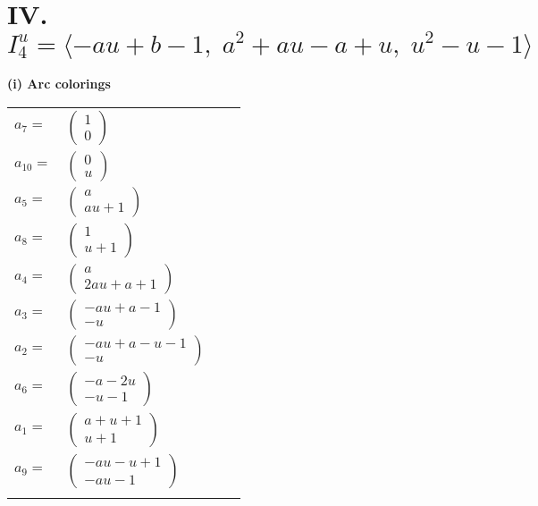 \documentclass[1p]{elsarticle_modified}
\theoremstyle{definition}
\begin{document}
\centering \section*{IV. $I^u_{4}= \langle - a u+b-1,\;a^2+a u- a+u,\;u^2- u-1 \rangle$}
\flushleft \textbf{(i) Arc colorings}\\
\begin{tabular}{m{7pt} m{180pt} m{7pt} m{180pt} }
\flushright $a_{7}=$&$\begin{pmatrix}1\\0\end{pmatrix}$ \\
\flushright $a_{10}=$&$\begin{pmatrix}0\\u\end{pmatrix}$ \\
\flushright $a_{5}=$&$\begin{pmatrix}a\\a u+1\end{pmatrix}$ \\
\flushright $a_{8}=$&$\begin{pmatrix}1\\u+1\end{pmatrix}$ \\
\flushright $a_{4}=$&$\begin{pmatrix}a\\2 a u+a+1\end{pmatrix}$ \\
\flushright $a_{3}=$&$\begin{pmatrix}- a u+a-1\\- u\end{pmatrix}$ \\
\flushright $a_{2}=$&$\begin{pmatrix}- a u+a- u-1\\- u\end{pmatrix}$ \\
\flushright $a_{6}=$&$\begin{pmatrix}- a-2 u\\- u-1\end{pmatrix}$ \\
\flushright $a_{1}=$&$\begin{pmatrix}a+u+1\\u+1\end{pmatrix}$ \\
\flushright $a_{9}=$&$\begin{pmatrix}- a u- u+1\\- a u-1\end{pmatrix}$\\&\end{tabular}
\end{document}
